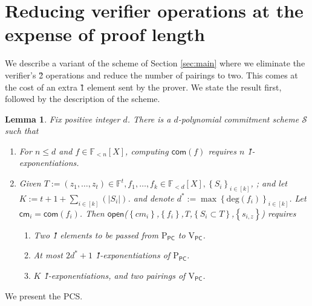 \documentclass[11pt]{article} %
\newcommand{\F}{\ensuremath{\mathbb F}\xspace}
\newcommand{\com}{\ensuremath{\mathsf{com}}\xspace}
\newcommand{\cm}{\ensuremath{\mathsf{cm}}\xspace}
\newcommand{\open}{\ensuremath{\mathsf{open}}\xspace}
\renewcommand{\deg}{\ensuremath{\mathrm{deg}}\xspace}
\newcommand{\defeq}{:=}
\newcommand{\sett}[2]{\ensuremath{\set{#1}_{#2}}\xspace}
\newcommand{\prvpc}{\ensuremath{\mathrm{P_{\mathsf{PC}}}}\xspace}
\newcommand{\verpc}{\ensuremath{\mathrm{V_{\mathsf{PC}}}}\xspace}
\newcommand{\set}[1]{\ensuremath{\left\{#1\right\}}\xspace}
\newcommand{\polysofdeg}[1]{\ensuremath{\F_{< #1}[X]}\xspace}
\newcommand{\PCscheme}{\ensuremath{\mathscr{S}}\xspace}
\newcommand{\sumi}[1]{\sum_{i\in[#1]}}
\newtheorem{lemma}{Lemma}[section]
\begin{document}
\section{Reducing verifier operations at the expense of proof length}
We describe a variant of the scheme of Section \ref{sec:main} where we eliminate the verifier's \G2 operations and reduce the number of pairings to two. This comes at the cost of an extra \G1 element sent by the prover. We state the result first, followed by the description of the scheme.

\begin{lemma}\label{lem:multikateG1}
 Fix positive integer $d$.
  There is a $d$-polynomial commitment scheme \PCscheme such that
  \begin{enumerate}
   \item For $n\leq d$ and $f\in \polysofdeg{n}$, computing $\com(f)$ requires $n$ \G1-exponentiations.
   \item Given $T \defeq (z_1,\ldots,z_t)\in \F^t, f_1,\ldots, f_k \in \polysofdeg{d}, \sett{S_i}{i\in [k]}$, ; and 
   let $K\defeq t+ 1 + \sumi {k}\left( |S_i|\right)$.
   and denote $d^* \defeq \max\sett{\deg(f_i)}{i\in [k]}$.
   Let $\cm_i = \com(f_i)$.
   Then \open(\set{cm_i},\set{f_i},T,\set{S_i\subset T},\set{s_{i,z}})  requires
   \begin{enumerate}
   \item Two  \G1 elements to be passed from \prvpc to \verpc.
    \item At most $2d^*+1$ \G1-exponentiations of \prvpc.
    \item $K$ \G1-exponentiations,  and two pairings of \verpc.
    \end{enumerate}
\end{enumerate}

 \end{lemma}


 We present the PCS.
 
\end{document}
